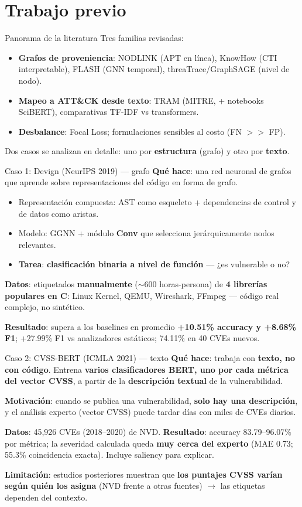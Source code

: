 \documentclass[aspectratio=169,10pt]{beamer}
\begin{document}
\section{Trabajo previo}
\begin{frame}{Panorama de la literatura}
Tres familias revisadas:
\begin{itemize}
\item \textbf{Grafos de proveniencia}: NODLINK (APT en l\'inea), KnowHow (CTI interpretable), FLASH (GNN temporal), threaTrace/GraphSAGE (nivel de nodo).
\item \textbf{Mapeo a ATT\&CK desde texto}: TRAM (MITRE, + notebooks SciBERT), comparativas TF-IDF vs transformers.
\item \textbf{Desbalance}: Focal Loss; formulaciones sensibles al costo (FN $>>$ FP).
\end{itemize}
Dos casos se analizan en detalle: uno por \textbf{estructura} (grafo) y otro por \textbf{texto}.
\end{frame}

\begin{frame}{Caso 1: Devign (NeurIPS 2019) — grafo}
\textbf{Qué hace}: una red neuronal de grafos que aprende sobre representaciones del código en forma de grafo.
\begin{itemize}
\item Representación compuesta: AST como esqueleto + dependencias de control y de datos como aristas.
\item Modelo: GGNN + m\'odulo \textbf{Conv} que selecciona jer\'arquicamente nodos relevantes.
\item \textbf{Tarea}: \textbf{clasificación binaria a nivel de función} — ¿es vulnerable o no?
\end{itemize}
\textbf{Datos}: etiquetados \textbf{manualmente} ($\sim$600 horas-persona) de \textbf{4 librerías populares en C}: Linux Kernel, QEMU, Wireshark, FFmpeg — código real complejo, no sintético.

\textbf{Resultado}: supera a los baselines en promedio \textbf{+10.51\% accuracy y +8.68\% F1}; +27.99\% F1 vs analizadores estáticos; 74.11\% en 40 CVEs nuevos.
\end{frame}

\begin{frame}{Caso 2: CVSS-BERT (ICMLA 2021) — texto}
\textbf{Qué hace}: trabaja con \textbf{texto, no con código}. Entrena \textbf{varios clasificadores BERT, uno por cada métrica del vector CVSS}, a partir de la \textbf{descripción textual} de la vulnerabilidad.

\textbf{Motivación}: cuando se publica una vulnerabilidad, \textbf{solo hay una descripción}, y el análisis experto (vector CVSS) puede tardar d\'ias con miles de CVEs diarios.

\textbf{Datos}: 45,926 CVEs (2018--2020) de NVD. \textbf{Resultado}: accuracy 83.79--96.07\% por métrica; la severidad calculada queda \textbf{muy cerca del experto} (MAE 0.73; 55.3\% coincidencia exacta). Incluye saliency para explicar.

\textbf{Limitación}: estudios posteriores muestran que \textbf{los puntajes CVSS varían según quién los asigna} (NVD frente a otras fuentes) $\to$ las etiquetas dependen del contexto.
\end{frame}
\end{document}

